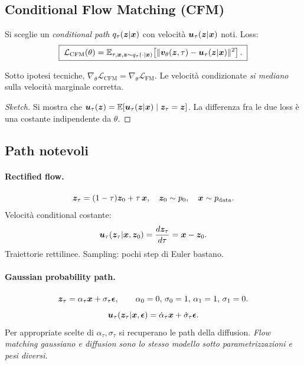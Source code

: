 \subsection{Conditional Flow Matching (CFM)}
Si sceglie un \emph{conditional path} $q_\tau(\bm{z}|\bm{x})$ con velocità $\bm{u}_\tau(\bm{z}|\bm{x})$ noti. Loss:
\begin{equation}\label{eq:cfm}
\boxed{\;\mathcal{L}_{\text{CFM}}(\theta) = \mathbb{E}_{\tau,\bm{x},\bm{z}\sim q_\tau(\cdot|\bm{x})}\!\left[\|\bm{v}_\theta(\bm{z},\tau) - \bm{u}_\tau(\bm{z}|\bm{x})\|^2\right].\;}
\end{equation}

\begin{theorem}[Lipman et al.\ 2023]
Sotto ipotesi tecniche, $\nabla_\theta \mathcal{L}_{\text{CFM}} = \nabla_\theta \mathcal{L}_{\text{FM}}$. Le velocità condizionate \emph{si mediano} sulla velocità marginale corretta.
\end{theorem}
\begin{proof}[Sketch]
Si mostra che $\bm{u}_\tau(\bm{z}) = \mathbb{E}[\bm{u}_\tau(\bm{z}|\bm{x}) \mid \bm{z}_\tau = \bm{z}]$. La differenza fra le due loss è una costante indipendente da $\theta$.
\end{proof}

\subsection{Path notevoli}

\paragraph{Rectified flow.}
\[
\bm{z}_\tau = (1-\tau)\bm{z}_0 + \tau\, \bm{x}, \quad \bm{z}_0 \sim p_0, \quad \bm{x} \sim p_{\text{data}}.
\]
Velocità conditional costante:
\[
\bm{u}_\tau(\bm{z}_\tau | \bm{x}, \bm{z}_0) = \frac{d\bm{z}_\tau}{d\tau} = \bm{x} - \bm{z}_0.
\]
Traiettorie rettilinee. Sampling: pochi step di Euler bastano.

\paragraph{Gaussian probability path.}
\[
\bm{z}_\tau = \alpha_\tau\bm{x} + \sigma_\tau\boldsymbol{\epsilon}, \qquad \alpha_0=0,\,\sigma_0=1,\, \alpha_1=1,\,\sigma_1=0.
\]
\[
\bm{u}_\tau(\bm{z}_\tau|\bm{x},\boldsymbol{\epsilon}) = \dot\alpha_\tau \bm{x} + \dot\sigma_\tau \boldsymbol{\epsilon}.
\]
Per appropriate scelte di $\alpha_\tau, \sigma_\tau$ si recuperano le path della diffusion. \emph{Flow matching gaussiano e diffusion sono lo stesso modello sotto parametrizzazioni e pesi diversi.}

